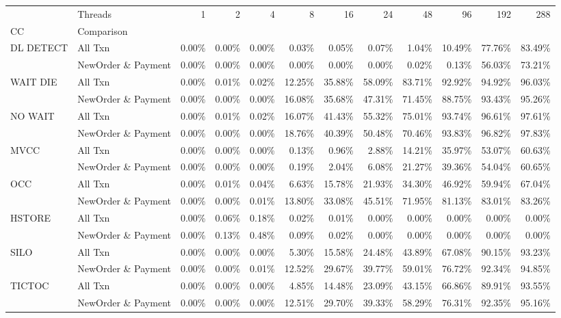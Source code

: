 \begin{tabular}{llrrrrrrrrrr}
\toprule
       & Threads &   1   &   2   &   4   &    8   &    16  &    24  &    48  &    96  &    192 &    288 \\
CC & Comparison &       &       &       &        &        &        &        &        &        &        \\
\midrule
DL DETECT & All Txn & 0.00\% & 0.00\% & 0.00\% &  0.03\% &  0.05\% &  0.07\% &  1.04\% & 10.49\% & 77.76\% & 83.49\% \\
       & NewOrder \& Payment & 0.00\% & 0.00\% & 0.00\% &  0.00\% &  0.00\% &  0.00\% &  0.02\% &  0.13\% & 56.03\% & 73.21\% \\
WAIT DIE & All Txn & 0.00\% & 0.01\% & 0.02\% & 12.25\% & 35.88\% & 58.09\% & 83.71\% & 92.92\% & 94.92\% & 96.03\% \\
       & NewOrder \& Payment & 0.00\% & 0.00\% & 0.00\% & 16.08\% & 35.68\% & 47.31\% & 71.45\% & 88.75\% & 93.43\% & 95.26\% \\
NO WAIT & All Txn & 0.00\% & 0.01\% & 0.02\% & 16.07\% & 41.43\% & 55.32\% & 75.01\% & 93.74\% & 96.61\% & 97.61\% \\
       & NewOrder \& Payment & 0.00\% & 0.00\% & 0.00\% & 18.76\% & 40.39\% & 50.48\% & 70.46\% & 93.83\% & 96.82\% & 97.83\% \\
MVCC & All Txn & 0.00\% & 0.00\% & 0.00\% &  0.13\% &  0.96\% &  2.88\% & 14.21\% & 35.97\% & 53.07\% & 60.63\% \\
       & NewOrder \& Payment & 0.00\% & 0.00\% & 0.00\% &  0.19\% &  2.04\% &  6.08\% & 21.27\% & 39.36\% & 54.04\% & 60.65\% \\
OCC & All Txn & 0.00\% & 0.01\% & 0.04\% &  6.63\% & 15.78\% & 21.93\% & 34.30\% & 46.92\% & 59.94\% & 67.04\% \\
       & NewOrder \& Payment & 0.00\% & 0.00\% & 0.01\% & 13.80\% & 33.08\% & 45.51\% & 71.95\% & 81.13\% & 83.01\% & 83.26\% \\
HSTORE & All Txn & 0.00\% & 0.06\% & 0.18\% &  0.02\% &  0.01\% &  0.00\% &  0.00\% &  0.00\% &  0.00\% &  0.00\% \\
       & NewOrder \& Payment & 0.00\% & 0.13\% & 0.48\% &  0.09\% &  0.02\% &  0.00\% &  0.00\% &  0.00\% &  0.00\% &  0.00\% \\
SILO & All Txn & 0.00\% & 0.00\% & 0.00\% &  5.30\% & 15.58\% & 24.48\% & 43.89\% & 67.08\% & 90.15\% & 93.23\% \\
       & NewOrder \& Payment & 0.00\% & 0.00\% & 0.01\% & 12.52\% & 29.67\% & 39.77\% & 59.01\% & 76.72\% & 92.34\% & 94.85\% \\
TICTOC & All Txn & 0.00\% & 0.00\% & 0.00\% &  4.85\% & 14.48\% & 23.09\% & 43.15\% & 66.86\% & 89.91\% & 93.55\% \\
       & NewOrder \& Payment & 0.00\% & 0.00\% & 0.00\% & 12.51\% & 29.70\% & 39.33\% & 58.29\% & 76.31\% & 92.35\% & 95.16\% \\
\bottomrule
\end{tabular}
